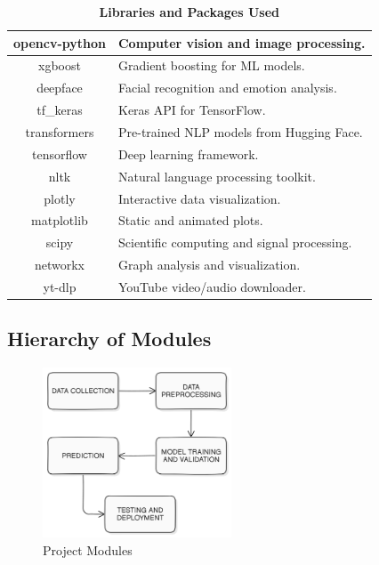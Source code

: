\begin{table}[H]
\begin{tabular}{|c|p{12cm}|}
        \hline
        opencv-python & Computer vision and image processing. \\
        \hline
        xgboost & Gradient boosting for ML models. \\
        \hline
        deepface & Facial recognition and emotion analysis. \\
        \hline
        tf\_keras & Keras API for TensorFlow. \\
        \hline
        transformers & Pre-trained NLP models from Hugging Face. \\
        \hline
        tensorflow & Deep learning framework. \\
        \hline
        nltk & Natural language processing toolkit. \\
        \hline
        plotly & Interactive data visualization. \\
        \hline 
        matplotlib & Static and animated plots. \\
        \hline
        scipy & Scientific computing and signal processing. \\
        \hline
        networkx & Graph analysis and visualization. \\
        \hline
        yt-dlp & YouTube video/audio downloader. \\
        \hline
    \end{tabular}
    \caption*{\textbf{Libraries and Packages Used}}
    \label{tab:libraries}
\end{table}

\pagebreak

\subsection{Hierarchy of Modules}
\begin{figure}[h!]  
    \centering
    \includegraphics[width=0.5\textwidth]{Images/Project Modules.png}  
    \caption{Project Modules}
    \label{Project Modules}  %
\end{figure}

